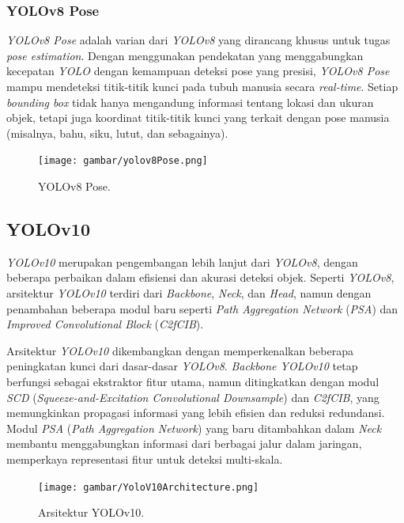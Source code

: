 \subsubsection{YOLOv8 Pose}
\label{subsubsec: YOLOv8 Pose}

\emph{YOLOv8 Pose} adalah varian dari \emph{YOLOv8} yang dirancang khusus untuk tugas \emph{pose estimation}. Dengan menggunakan pendekatan yang menggabungkan kecepatan \emph{YOLO} dengan kemampuan deteksi pose yang presisi, \emph{YOLOv8 Pose} mampu mendeteksi titik-titik kunci pada tubuh manusia secara \emph{real-time}. Setiap \emph{bounding box} tidak hanya mengandung informasi tentang lokasi dan ukuran objek, tetapi juga koordinat titik-titik kunci yang terkait dengan pose manusia (misalnya, bahu, siku, lutut, dan sebagainya).

\begin{figure}[H]
  \centering
  \texttt{[image: gambar/yolov8Pose.png]}
  \caption{YOLOv8 Pose.}
  \label{fig:Yolov8Pose}
\end{figure}

\subsection{YOLOv10}
\label{subsec:YOLOv10}

\emph{YOLOv10} merupakan pengembangan lebih lanjut dari \emph{YOLOv8}, dengan beberapa perbaikan dalam efisiensi dan akurasi deteksi objek. Seperti \emph{YOLOv8}, arsitektur \emph{YOLOv10} terdiri dari \emph{Backbone}, \emph{Neck}, dan \emph{Head}, namun dengan penambahan beberapa modul baru seperti \emph{Path Aggregation Network} (\emph{PSA}) dan \emph{Improved Convolutional Block} (\emph{C2fCIB}).

Arsitektur \emph{YOLOv10} dikembangkan dengan memperkenalkan beberapa peningkatan kunci dari dasar-dasar \emph{YOLOv8}. \emph{Backbone YOLOv10} tetap berfungsi sebagai ekstraktor fitur utama, namun ditingkatkan dengan modul \emph{SCD} (\emph{Squeeze-and-Excitation Convolutional Downsample}) dan \emph{C2fCIB}, yang memungkinkan propagasi informasi yang lebih efisien dan reduksi redundansi. Modul \emph{PSA} (\emph{Path Aggregation Network}) yang baru ditambahkan dalam \emph{Neck} membantu menggabungkan informasi dari berbagai jalur dalam jaringan, memperkaya representasi fitur untuk deteksi multi-skala.

\begin{figure}[H]
  \centering
  \texttt{[image: gambar/YoloV10Architecture.png]}
  \caption{Arsitektur YOLOv10.}
  \label{fig:ArsitekturYolov10}
\end{figure}

